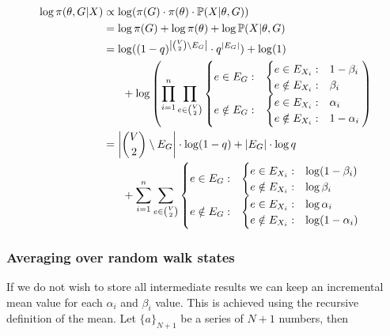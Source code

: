 \documentclass{scrartcl}
\newcommand{\prob}{\mathbb{P}}
\begin{document}
\begin{align*}
  \log\pi(\theta,G|X) &\propto \log (\pi(G)\cdot\pi(\theta)\cdot\prob(X|\theta,G))\\
    &= \log\pi(G)+\log\pi(\theta)+\log\prob(X|\theta,G)\\
    &= \log((1-q)^{\left |\binom{V}{2}\setminus E_G \right |} \cdot q^{|E_G|})
       + \log(1)\\
       &\hspace{4ex} + \log\left ( \prod_{i=1}^n \prod_{e \in \binom{V}{2}} \begin{cases}
				e \in E_G: & 
				\begin{cases}
				  e \in E_{X_i}: & 1-\beta_i\\
				  e \notin E_{X_i}: & \beta_i
				\end{cases}
				\\
				e \notin E_G: & 
				\begin{cases}
				  e \in E_{X_i}: & \alpha_i\\
				  e \notin E_{X_i}: & 1-\alpha_i
				\end{cases}
			\end{cases} \right )\\
		&= \left |\binom{V}{2}\setminus E_G \right | \cdot \log(1-q) + |E_G|\cdot \log q\\
		&\hspace{4ex} + \sum_{i=1}^n \sum_{e \in \binom{V}{2}} \begin{cases}
				e \in E_G: & 
				\begin{cases}
				  e \in E_{X_i}: & \log(1-\beta_i)\\
				  e \notin E_{X_i}: & \log\beta_i
				\end{cases}
				\\
				e \notin E_G: & 
				\begin{cases}
				  e \in E_{X_i}: & \log\alpha_i\\
				  e \notin E_{X_i}: & \log(1-\alpha_i)
				\end{cases}
			\end{cases}
\end{align*}


\subsubsection{Averaging over random walk states}

If we do not wish to store all intermediate results we can keep an incremental mean value for each $\alpha_i$ and $\beta_i$ value. This is achieved using the recursive definition of the mean. Let $\{a\}_{N+1}$ be a series of $N+1$ numbers, then
\end{document}
